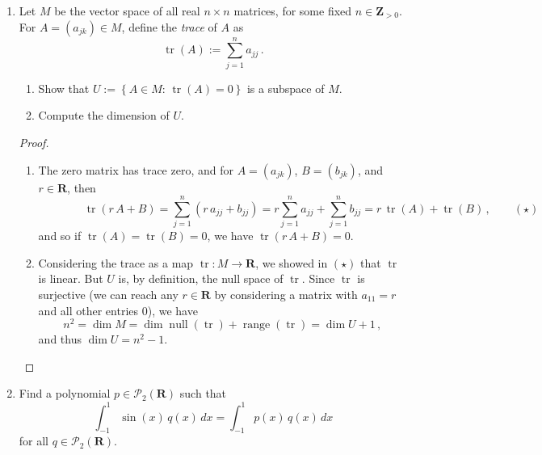 \documentclass[12pt]{amsart}
\def\R{\mathbf{R}}
\def\Z{\mathbf{Z}}
\def\P{\mathcal{P}}
\renewcommand\null{\operatorname{null}}
\newcommand\range{\operatorname{range}}
\newcommand\tr{\operatorname{tr}}
\begin{document}
\begin{enumerate}
\begin{proof}
\begin{enumerate}
\end{enumerate}
\end{proof}

\item Let $M$ be the vector space of all real $n \times n$ matrices, for some fixed $n \in \Z_{ >0 }$.
For $A = \left( a_{ jk }  \right) \in M$, define the \emph{trace} of $A$ as
\[
  \tr(A) := \sum_{ j=1 }^n a_{ jj } \, .
\]
  \begin{enumerate} 
  \item Show that $U := \left\{ A \in M : \, \tr(A) = 0 \right\}$ is a subspace of $M$.
  \item Compute the dimension of $U$. %
  \end{enumerate}

\begin{proof}
\begin{enumerate}

\item The zero matrix has trace zero, and for $A = \left( a_{ jk } \right)$, $B = \left( b_{ jk } \right)$, and $r \in \R$, then
\[ \qquad \qquad
  \tr(r \, A + B)
  = \sum_{ j=1 }^n \left( r \, a_{ jj } + b_{ jj } \right)
  = r \sum_{ j=1 }^n a_{ jj } + \sum_{ j=1 }^n b_{ jj }
  = r \, \tr(A) + \tr(B) \, , \qquad (\star)
\]
and so if $\tr(A) = \tr(B) = 0$, we have $\tr(r \, A + B) = 0$.

\item Considering the trace as a map $\tr : M \to \R$, we showed in $(\star)$ that $\tr$ is linear.
But $U$ is, by definition, the null space of $\tr$. Since $\tr$ is surjective (we can reach any $r \in \R$ by considering a matrix with $a_{ 11 } = r$ and all other entries 0), we have
\[
  n^2
  = \dim M
  = \dim \null(\tr) + \range(\tr)
  = \dim U + 1 \, ,
\]
and thus $\dim U = n^2 - 1$. \qedhere

\end{enumerate}
\end{proof}

\item Find a polynomial $p \in \P_2(\R)$ such that
\[
  \int_{ -1 }^1 \sin(x) \, q(x) \, dx = \int_{ -1 }^1 p(x) \, q(x) \, dx
\]
for all $q \in \P_2(\R)$.


\end{enumerate}
\end{document}
